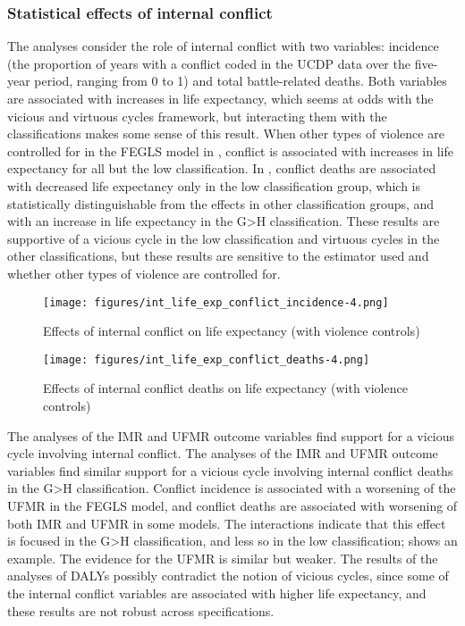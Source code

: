 \documentclass[12pt]{article}
\begin{document}
\subsubsection{Statistical effects of internal conflict}

The analyses consider the role of internal conflict with two variables: incidence (the proportion of years with a conflict coded in the UCDP data over the five-year period, ranging from 0 to 1) and total battle-related deaths.
Both variables are associated with increases in life expectancy, which seems at odds with the vicious and virtuous cycles framework, but interacting them with the classifications makes some sense of this result.
When other types of violence are controlled for in the FEGLS model in , conflict is associated with increases in life expectancy for all but the low classification.
In , conflict deaths are associated with decreased life expectancy only in the low classification group, which is statistically distinguishable from the effects in other classification groups, and with an increase in life expectancy in the G>H classification.
These results are supportive of a vicious cycle in the low classification and virtuous cycles in the other classifications, but these results are sensitive to the estimator used and whether other types of violence are controlled for.

\begin{figure}[!htb]
    \centering
    \caption{Effects of internal conflict on life expectancy (with violence controls)}
    \label{int_life_exp_conflict}
    \texttt{[image: figures/int\_life\_exp\_conflict\_incidence-4.png]}
\end{figure}

\begin{figure}[!htb]
    \centering
    \caption{Effects of internal conflict deaths on life expectancy (with violence controls)}
    \label{int_life_exp_conflict_deaths}
    \texttt{[image: figures/int\_life\_exp\_conflict\_deaths-4.png]}
\end{figure}

The analyses of the IMR and UFMR outcome variables find support for a vicious cycle involving internal conflict.
The analyses of the IMR and UFMR outcome variables find similar support for a vicious cycle involving internal conflict deaths in the G>H classification.
Conflict incidence is associated with a worsening of the UFMR in the FEGLS model, and conflict deaths are associated with worsening of both IMR and UFMR in some models.
The interactions indicate that this effect is focused in the G>H classification, and less so in the low classification;  shows an example.
The evidence for the UFMR is similar but weaker.
The results of the analyses of DALYs possibly contradict the notion of vicious cycles, since some of the internal conflict variables are associated with higher life expectancy, and these results are not robust across specifications.
\end{document}

